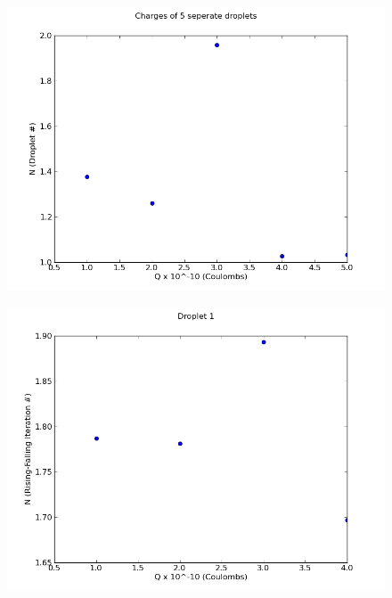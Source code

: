 \documentclass[12pt]{article}
\begin{document}
\begin{figure}[H]
\centering
\hspace{-0.0in}\includegraphics[scale=0.60]{Plot1.png}
\end{figure}

\begin{figure}[H]
\centering
\hspace{-0.0in}\includegraphics[scale=0.60]{Plot2.png}
\end{figure}
\end{document}
